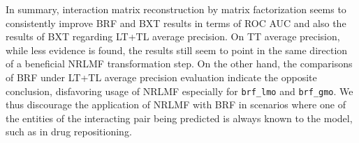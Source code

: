 





In summary, interaction matrix reconstruction by matrix factorization seems to consistently improve BRF and BXT results in terms of ROC AUC and also the results of BXT regarding LT+TL average precision. On TT average precision, while less evidence is found, the results still seem to point in the same direction of a beneficial NRLMF transformation step. On the other hand, the comparisons of BRF under LT+TL average precision evaluation indicate the opposite conclusion, disfavoring usage of NRLMF especially for \texttt{brf\_lmo} and \texttt{brf\_gmo}. We thus discourage the application of NRLMF with BRF in scenarios where one of the entities of the interacting pair being predicted is always known to the model, such as in drug repositioning.


% 

